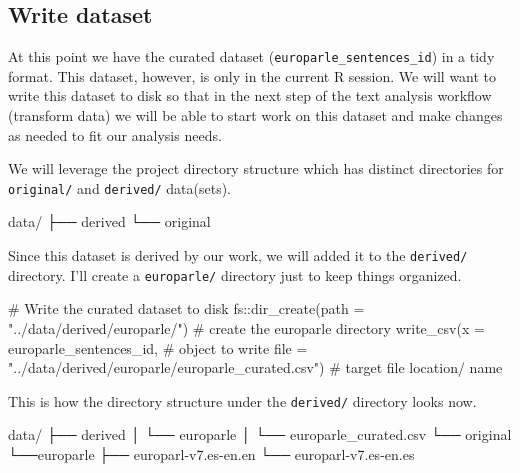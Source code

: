 \documentclass[
  letterpaper,
]{latex/krantz}
\newenvironment{Shaded}{\begin{snugshade}}{\end{snugshade}}
\newcommand{\AttributeTok}[1]{\textcolor[rgb]{0.40,0.45,0.13}{#1}}
\newcommand{\CommentTok}[1]{\textcolor[rgb]{0.37,0.37,0.37}{#1}}
\newcommand{\ExtensionTok}[1]{\textcolor[rgb]{0.00,0.23,0.31}{#1}}
\newcommand{\FunctionTok}[1]{\textcolor[rgb]{0.28,0.35,0.67}{#1}}
\newcommand{\NormalTok}[1]{\textcolor[rgb]{0.00,0.23,0.31}{#1}}
\newcommand{\SpecialCharTok}[1]{\textcolor[rgb]{0.37,0.37,0.37}{#1}}
\newcommand{\StringTok}[1]{\textcolor[rgb]{0.13,0.47,0.30}{#1}}
\begin{document}
\hypertarget{write-dataset}{%
\subsection{Write dataset}\label{write-dataset}}

At this point we have the curated dataset
(\texttt{europarle\_sentences\_id}) in a tidy format. This dataset,
however, is only in the current R session. We will want to write this
dataset to disk so that in the next step of the text analysis workflow
(transform data) we will be able to start work on this dataset and make
changes as needed to fit our analysis needs.

We will leverage the project directory structure which has distinct
directories for \texttt{original/} and \texttt{derived/} data(sets).

\begin{Shaded}
\begin{Highlighting}[]
\ExtensionTok{data/}
\ExtensionTok{├──}\NormalTok{ derived}
\ExtensionTok{└──}\NormalTok{ original}
\end{Highlighting}
\end{Shaded}

Since this dataset is derived by our work, we will added it to the
\texttt{derived/} directory. I'll create a \texttt{europarle/} directory
just to keep things organized.

\begin{Shaded}
\begin{Highlighting}[]
\CommentTok{\# Write the curated dataset to disk}
\NormalTok{fs}\SpecialCharTok{::}\FunctionTok{dir\_create}\NormalTok{(}\AttributeTok{path =} \StringTok{"../data/derived/europarle/"}\NormalTok{) }\CommentTok{\# create the europarle directory}
\FunctionTok{write\_csv}\NormalTok{(}\AttributeTok{x =}\NormalTok{ europarle\_sentences\_id, }\CommentTok{\# object to write}
          \AttributeTok{file =} \StringTok{"../data/derived/europarle/europarle\_curated.csv"}\NormalTok{) }\CommentTok{\# target file location/ name}
\end{Highlighting}
\end{Shaded}

This is how the directory structure under the \texttt{derived/}
directory looks now.

\begin{Shaded}
\begin{Highlighting}[]
\ExtensionTok{data/}
\ExtensionTok{├──}\NormalTok{ derived}
\ExtensionTok{│}\NormalTok{   └── europarle}
\ExtensionTok{│}\NormalTok{       └── europarle\_curated.csv}
\ExtensionTok{└──}\NormalTok{ original}
    \ExtensionTok{└──europarle}
        \ExtensionTok{├──}\NormalTok{ europarl{-}v7.es{-}en.en}
        \ExtensionTok{└──}\NormalTok{ europarl{-}v7.es{-}en.es}
\end{Highlighting}
\end{Shaded}
\end{document}
